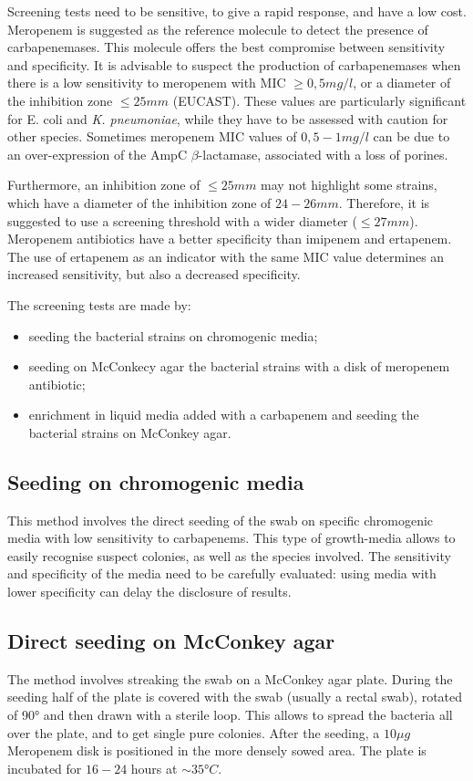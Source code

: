 \documentclass[11pt]{report}
\begin{document}
Screening tests need to be sensitive, to give a rapid response, and have a low cost.
Meropenem is suggested as the reference molecule to detect the presence of carbapenemases. This molecule offers the best compromise between sensitivity and specificity. 
It is advisable to suspect the production of carbapenemases when there is a low sensitivity to meropenem with MIC $\ge 0,5 mg/l$, or a diameter of the inhibition zone $\le 25 mm$ (EUCAST).
These values are particularly significant for E. coli and \emph{K. pneumoniae}, while they have to be assessed with caution for other species. Sometimes meropenem MIC values of $0,5-1 mg/l$ can be due to an over-expression of the AmpC $\beta$-lactamase, associated with a loss of porines.

Furthermore, an inhibition zone of $\le 25 mm$ may not highlight some strains, which have a diameter of the inhibition zone of $24-26 mm$. Therefore, it is suggested to use a screening threshold with a wider diameter ($\le 27 mm$).
Meropenem antibiotics have a better specificity than imipenem and ertapenem.
The use of ertapenem as an indicator with the same MIC value determines an increased sensitivity, but also a decreased specificity.

The screening tests are made by:
\begin{itemize}
\item seeding the bacterial strains on chromogenic media;
\item seeding on McConkecy agar the bacterial strains with a disk of meropenem antibiotic;
\item enrichment in liquid media added with a carbapenem and seeding the bacterial strains on McConkey agar.
\end{itemize}

\subsection{Seeding on chromogenic media}
This method involves the direct seeding of the swab on specific chromogenic media with low sensitivity to carbapenems.
This type of growth-media allows to easily recognise suspect colonies, as well as the species involved.
The sensitivity and specificity of the media need to be carefully evaluated: using media with lower specificity can delay the disclosure of results.

\subsection{Direct seeding on McConkey agar}
The method involves streaking the swab on a McConkey agar plate.
During the seeding half of the plate is covered with the swab (usually a rectal swab), rotated of 90° and then drawn with a sterile loop. 
This allows to spread the bacteria all over the plate, and to get single pure colonies.
After the seeding, a $10\mu g$ Meropenem disk is positioned in the more densely sowed area.
The plate is incubated for $16-24$ hours at $\sim 35°C$.
\end{document}
